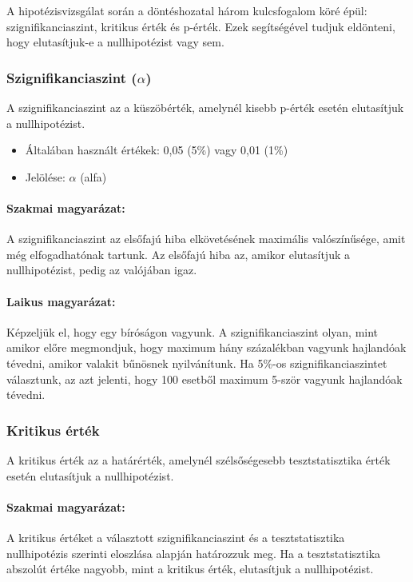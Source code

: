 \documentclass[a4paper,12pt]{article}
\begin{document}
    A hipotézisvizsgálat során a döntéshozatal három kulcsfogalom köré épül: szignifikanciaszint, kritikus érték és p-érték. Ezek segítségével tudjuk eldönteni, hogy elutasítjuk-e a nullhipotézist vagy sem.

    \subsubsection{Szignifikanciaszint ($\alpha$)}

    A szignifikanciaszint az a küszöbérték, amelynél kisebb p-érték esetén elutasítjuk a nullhipotézist.

    \begin{itemize}
        \item Általában használt értékek: 0,05 (5\%) vagy 0,01 (1\%)
        \item Jelölése: $\alpha$ (alfa)
    \end{itemize}

    \paragraph{Szakmai magyarázat:} A szignifikanciaszint az elsőfajú hiba elkövetésének maximális valószínűsége, amit még elfogadhatónak tartunk. Az elsőfajú hiba az, amikor elutasítjuk a nullhipotézist, pedig az valójában igaz.

    \paragraph{Laikus magyarázat:} Képzeljük el, hogy egy bíróságon vagyunk. A szignifikanciaszint olyan, mint amikor előre megmondjuk, hogy maximum hány százalékban vagyunk hajlandóak tévedni, amikor valakit bűnösnek nyilvánítunk. Ha 5\%-os szignifikanciaszintet választunk, az azt jelenti, hogy 100 esetből maximum 5-ször vagyunk hajlandóak tévedni.

    \subsubsection{Kritikus érték}

    A kritikus érték az a határérték, amelynél szélsőségesebb tesztstatisztika érték esetén elutasítjuk a nullhipotézist.

    \paragraph{Szakmai magyarázat:} A kritikus értéket a választott szignifikanciaszint és a tesztstatisztika nullhipotézis szerinti eloszlása alapján határozzuk meg. Ha a tesztstatisztika abszolút értéke nagyobb, mint a kritikus érték, elutasítjuk a nullhipotézist.
\end{document}
